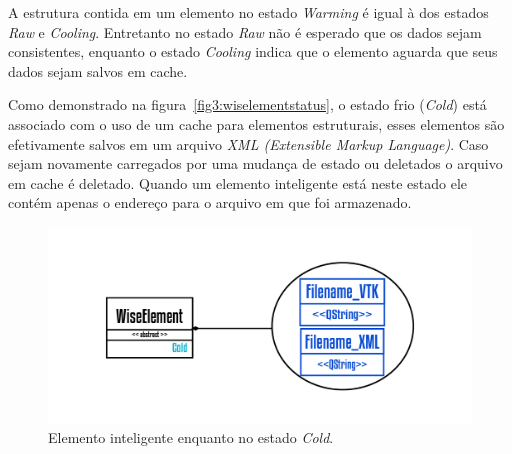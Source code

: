 \documentclass[
        english,			
        brazil			        %
        ,<...>]{abntbibufjf}
\begin{document}
A estrutura contida em um elemento no estado \textit{Warming} é igual à dos estados \textit{Raw} e \textit{Cooling}. Entretanto no estado \textit{Raw} não é esperado que os dados sejam consistentes, enquanto o estado \textit{Cooling} indica que o elemento aguarda que seus dados sejam salvos em cache.

Como demonstrado na figura~\ref{fig3:wiselementstatus}, o estado frio (\textit{Cold}) está associado com o uso de um cache para elementos estruturais, esses elementos são efetivamente salvos em um arquivo \textit{XML (Extensible Markup Language)}. Caso sejam novamente carregados por uma mudança de estado ou deletados o arquivo em cache é deletado. Quando um elemento inteligente está neste estado ele contém apenas o endereço para o arquivo em que foi armazenado.

\begin{figure}[!htbp]
	\centering
	\includegraphics[scale=1]{Figures/WiseElementCold.png}
	\caption{Elemento inteligente enquanto no estado \textit{Cold}.}
	\label{fig5:wiselementcold}
\end{figure}





\end{document}
